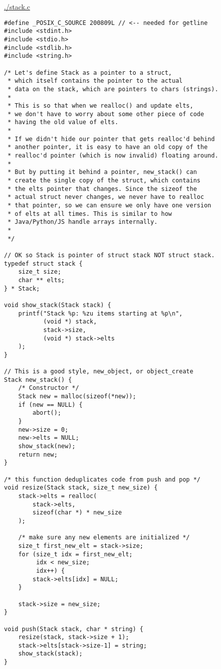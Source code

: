 \documentclass[11pt]{article}
\begin{document}
\url{./stack.c}
\begin{verbatim}
#define _POSIX_C_SOURCE 200809L // <-- needed for getline
#include <stdint.h>
#include <stdio.h>
#include <stdlib.h>
#include <string.h>

/* Let's define Stack as a pointer to a struct,
 * which itself contains the pointer to the actual
 * data on the stack, which are pointers to chars (strings).
 * 
 * This is so that when we realloc() and update elts,
 * we don't have to worry about some other piece of code
 * having the old value of elts.
 * 
 * If we didn't hide our pointer that gets realloc'd behind
 * another pointer, it is easy to have an old copy of the
 * realloc'd pointer (which is now invalid) floating around.
 * 
 * But by putting it behind a pointer, new_stack() can
 * create the single copy of the struct, which contains
 * the elts pointer that changes. Since the sizeof the
 * actual struct never changes, we never have to realloc
 * that pointer, so we can ensure we only have one version
 * of elts at all times. This is similar to how
 * Java/Python/JS handle arrays internally.
 * 
 */

// OK so Stack is pointer of struct stack NOT struct stack.
typedef struct stack {
    size_t size;
    char ** elts;
} * Stack;

void show_stack(Stack stack) {
    printf("Stack %p: %zu items starting at %p\n",
           (void *) stack,
           stack->size,
           (void *) stack->elts
    );
}

// This is a good style, new_object, or object_create
Stack new_stack() {
    /* Constructor */
    Stack new = malloc(sizeof(*new));
    if (new == NULL) {
        abort();
    }
    new->size = 0;
    new->elts = NULL;
    show_stack(new);
    return new;
}

/* this function deduplicates code from push and pop */
void resize(Stack stack, size_t new_size) {
    stack->elts = realloc(
        stack->elts,
        sizeof(char *) * new_size
    );
    
    /* make sure any new elements are initialized */
    size_t first_new_elt = stack->size;
    for (size_t idx = first_new_elt;
         idx < new_size;
         idx++) {
        stack->elts[idx] = NULL;
    }
    
    stack->size = new_size;
}

void push(Stack stack, char * string) {
    resize(stack, stack->size + 1);
    stack->elts[stack->size-1] = string;
    show_stack(stack);
}


\end{verbatim}
\end{document}
